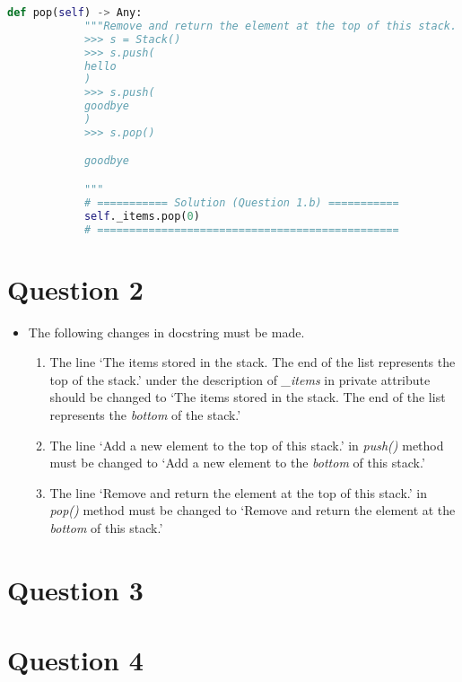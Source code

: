 \documentclass[12pt]{article}
\begin{document}
\begin{enumerate}[a.]
\begin{lstlisting}[language=Python,caption={worksheet\_10\_q1b\_solution.py},captionpos=b]
        def pop(self) -> Any:
            """Remove and return the element at the top of this stack.
            >>> s = Stack()
            >>> s.push(
            hello
            )
            >>> s.push(
            goodbye
            )
            >>> s.pop()

            goodbye

            """
            # =========== Solution (Question 1.b) ===========
            self._items.pop(0)
            # ===============================================
    \end{lstlisting}

\end{enumerate}

\section*{Question 2}
\begin{itemize}
    \item

    The following changes in docstring must be made.

    \begin{enumerate}[1.]
        \item The line `The items stored in the stack. The end of the list represents the top of the stack.'
        under the description of \textit{\_items} in private attribute should be changed to
        `The items stored in the stack. The end of the list represents the \textit{bottom} of the stack.'
        \item The line `Add a new element to the top of this stack.' in \textit{push()}
        method must be changed to `Add a new element to the \textit{bottom} of this stack.'
        \item The line `Remove and return the element at the top of this stack.'
        in \textit{pop()} method must be changed to `Remove and return the
        element at the \textit{bottom} of this stack.'
    \end{enumerate}
\end{itemize}

\section*{Question 3}

\section*{Question 4}
\end{document}
